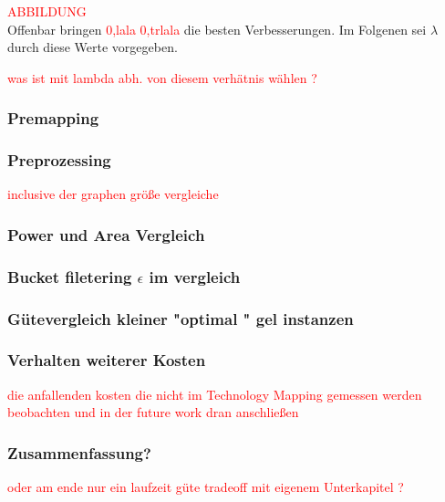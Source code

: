 \documentclass[11pt, a4paper, german]{article}
\newcommand{\TM}{Technology  Mapping }
\begin{document}
\textcolor{red}{ABBILDUNG}\\

Offenbar bringen \textcolor{red}{0,lala  0,trlala} die besten Verbesserungen. Im Folgenen sei $\lambda$ durch diese Werte vorgegeben. 

\textcolor{red}{was ist mit lambda abh. von diesem verhätnis wählen ?}

\subsubsection{Premapping}

\subsubsection{Preprozessing}
\textcolor{red}{inclusive der graphen größe vergleiche}

\subsubsection{Power und Area Vergleich}

\subsubsection{Bucket filetering $\epsilon$ im vergleich }

\subsubsection{Gütevergleich kleiner "optimal " gel instanzen}


\subsubsection{Verhalten weiterer Kosten}
\textcolor{red}{die anfallenden kosten die nicht im \TM gemessen werden beobachten und in der future work dran anschließen}

\subsubsection{Zusammenfassung?}
\textcolor{red}{oder am ende nur ein laufzeit güte tradeoff mit eigenem Unterkapitel ?} 
 
 
\end{document}
